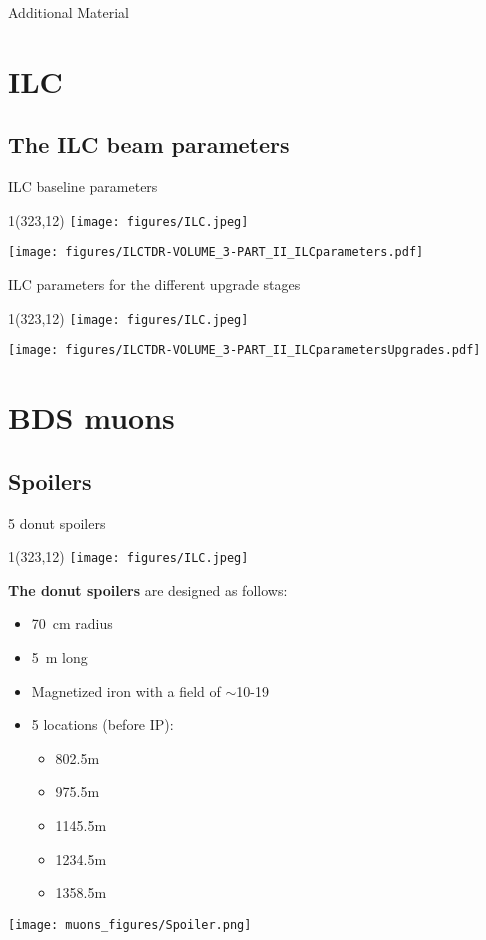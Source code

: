 \documentclass[xcolor={dvipsnames}]{beamer}
\newcommand{\ilclogo}{
  \setlength{\TPHorizModule}{1pt}
  \setlength{\TPVertModule}{1pt}
  \begin{textblock}{1}(323,12)
   \texttt{[image: figures/ILC.jpeg]}
  \end{textblock}
}
\begin{document}
\appendix

\begin{frame}
\begin{center}
\LARGE Additional Material
\end{center}
  \tableofcontents
\end{frame}

\section{ILC}

\subsection{The ILC beam parameters}
\begin{frame}{ILC baseline parameters}
\ilclogo
\begin{center}
	\texttt{[image: figures/ILCTDR-VOLUME\_3-PART\_II\_ILCparameters.pdf]}
\end{center}
\end{frame}
\begin{frame}{ILC parameters for the different upgrade stages}
\ilclogo
\begin{center}
	\texttt{[image: figures/ILCTDR-VOLUME\_3-PART\_II\_ILCparametersUpgrades.pdf]}
\end{center}
\end{frame}

\section{BDS muons}
\subsection{Spoilers}
\begin{frame}{5 donut spoilers}
\ilclogo
\textbf{The donut spoilers} are designed as follows:
\begin{itemize}
 \item \SI{70}{\centi\meter} radius
 \item \SI{5}{\meter} long
 \item Magnetized iron with a field of $\sim$10-\SI{19}{\kilo\gauss}
 \item 5 locations (before IP):
 \begin{itemize}
  \item 802.5m
  \item 975.5m
  \item 1145.5m
  \item 1234.5m
  \item 1358.5m
 \end{itemize}

\end{itemize}
\begin{center}
\texttt{[image: muons\_figures/Spoiler.png]}
\end{center}
\end{frame}
\end{document}
